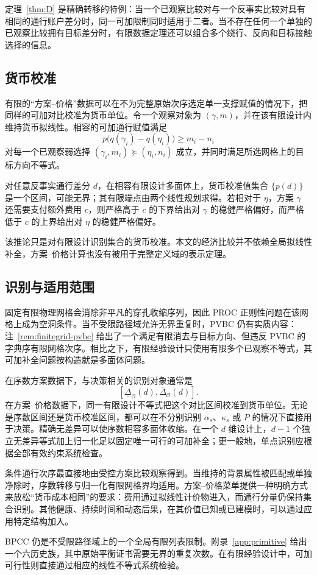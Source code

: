 定理~\ref{thm:D} 是精确转移的特例：当一个已观察比较对与一个反事实比较对具有相同的通行账户差分时，同一可加限制同时适用于二者。当不存在任何一个单独的已观察比较拥有目标差分时，有限数据定理还可以组合多个绕行、反向和目标接触选择的信息。

\subsection{货币校准}\label{sec:wtp}

有限的“方案--价格”数据可以在不为完整原始次序选定单一支撑赋值的情况下，把同样的可加对比校准为货币单位。令一个观察对象为 $(\gamma,m)$，并在该有限设计内维持货币拟线性。相容的可加通行赋值满足
\[
 p\bigl(q(\gamma_i)-q(\eta_i)\bigr)\ge m_i-n_i
\]
对每一个已观察弱选择 $(\gamma_i,m_i)\succeq(\eta_i,n_i)$ 成立，并同时满足所选网格上的目标方向不等式。

\begin{corollary}[货币校准的通行锐界]\label{cor:wtp}
对任意反事实通行差分 $d$，在相容有限设计多面体上，货币校准值集合 $\{p(d)\}$ 是一个区间，可能无界；其有限端点由两个线性规划求得。若相对于 $\eta$，方案 $\gamma$ 还需要支付额外费用 $c$，则严格高于 $c$ 的下界给出对 $\gamma$ 的稳健严格偏好，而严格低于 $c$ 的上界给出对 $\eta$ 的稳健严格偏好。
\end{corollary}

该推论只是对有限设计识别集合的货币校准。本文的经济比较并不依赖全局拟线性补全，方案--价格计算也没有被用于完整定义域的表示定理。

\subsection{识别与适用范围}

固定有限物理网格会消除非平凡的穿孔收缩序列，因此 PROC 正则性问题在该网格上成为空洞条件。当不受限路径域允许无界重复时，PVBC 仍有实质内容：注~\ref{rem:finitegrid-pvbc} 给出了一个满足有限消去与目标方向、但违反 PVBC 的字典序有限网格次序。相比之下，有限经验设计只使用有限多个已观察不等式，其可加补全问题按构造就是多面体问题。

在序数方案数据下，与决策相关的识别对象通常是
\[
 [\underline\Delta_{\mathcal O}(d),\overline\Delta_{\mathcal O}(d)].
\]
在方案--价格数据下，同一有限设计不等式把这个对比区间校准到货币单位。无论是序数区间还是货币校准区间，都可以在不分别识别 $\alpha_s$、$\kappa_s$ 或 $P$ 的情况下直接用于决策。精确无差异可以使序数相容多面体收缩。在一个 $d$ 维设计上，$d-1$ 个独立无差异等式加上归一化足以固定唯一可行的可加补全；更一般地，单点识别应根据全部有效约束系统检查。

条件通行次序最直接地由受控方案比较观察得到。当维持的背景属性被匹配或单独净除时，序数转移与归一化有限网格界均适用。方案--价格菜单提供一种明确方式来放松“货币成本相同”的要求：费用通过拟线性计价物进入，而通行分量仍保持集合识别。其他健康、持续时间和动态后果，在其价值已知或已建模时，可以通过应用特定结构加入。

BPCC 仍是不受限路径域上的一个全局有限列表限制。附录~\ref{app:primitive} 给出一个六历史族，其中原始平衡证书需要无界的重复次数。在有限经验设计中，可加可行性则直接通过相应的线性不等式系统检验。
